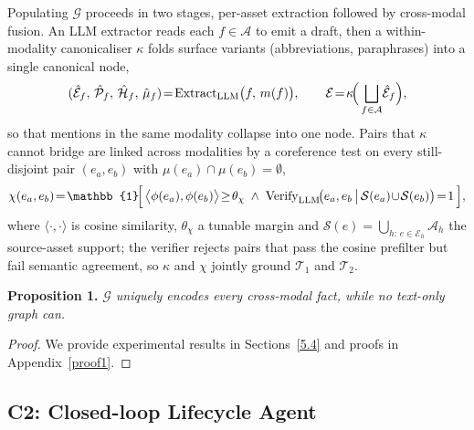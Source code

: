 \documentclass{article}
\begin{document}
Populating $\mathcal{G}$ proceeds in two stages, per-asset extraction followed by cross-modal fusion. An LLM extractor reads each $f\!\in\!\mathcal{A}$ to emit a draft, then a within-modality canonicaliser $\kappa$ folds surface variants (abbreviations, paraphrases) into a single canonical node,
\begin{equation}
(\hat{\mathcal{E}}_f,\,\hat{\mathcal{P}}_f,\,\hat{\mathcal{H}}_f,\,\hat{\mu}_f)\!=\!\mathrm{Extract}_{\mathrm{LLM}}\bigl(f,\,m(f)\bigr),\qquad \mathcal{E}\!=\!\kappa\!\Bigl(\,\bigsqcup_{f\in\mathcal{A}}\!\hat{\mathcal{E}}_f\Bigr),
\label{eq:extract}
\end{equation}
so that mentions in the same modality collapse into one node. Pairs that $\kappa$ cannot bridge are linked across modalities by a coreference test on every still-disjoint pair $(e_a,e_b)$ with $\mu(e_a)\!\cap\!\mu(e_b)\!=\!\emptyset$,
\begin{equation}
\chi(e_a,e_b)\!=\!\mathbb{1}\!\Bigl[\,\bigl\langle\phi(e_a),\phi(e_b)\bigr\rangle\!\geq\!\theta_{\chi}\;\wedge\;\mathrm{Verify}_{\mathrm{LLM}}\!\bigl(e_a,e_b\,\big|\,\mathcal{S}(e_a)\!\cup\!\mathcal{S}(e_b)\bigr)\!=\!1\,\Bigr],
\label{eq:coref}
\end{equation}
where $\langle\cdot,\cdot\rangle$ is cosine similarity, $\theta_{\chi}$ a tunable margin and $\mathcal{S}(e)\!=\!\bigcup_{h:\,e\in\mathcal{E}_h}\!\mathcal{A}_h$ the source-asset support; the verifier rejects pairs that pass the cosine prefilter but fail semantic agreement, so $\kappa$ and $\chi$ jointly ground $\mathcal{T}_1$ and $\mathcal{T}_2$.

\textbf{Proposition 1.} \textit{$\mathcal{G}$ uniquely encodes every cross-modal fact, while no text-only graph can.}\nopagebreak[4]\vspace{-2mm}\nopagebreak[4]
\begin{proof}
We provide experimental results in Sections~\ref{5.4} and proofs in Appendix~\ref{proof1}.
\end{proof}

\subsection{C2: Closed-loop Lifecycle Agent}\label{sec:c2}
\end{document}
